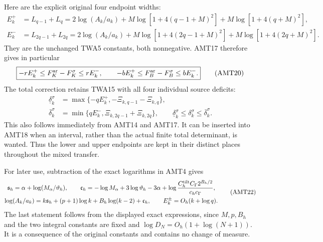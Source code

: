 \documentclass[11pt,a4paper]{article}
\begin{document}
Here are the explicit original four endpoint widths:
\[
\begin{aligned}
 E_k^+&=L_{q-1}+L_q
   =2\log(A_k/a_k)+M\log[1+4(q-1+M)^2]
                         +M\log[1+4(q+M)^2],\\
 E_k^-&=L_{2q-1}+L_{2q}
   =2\log(A_k/a_k)+M\log[1+4(2q-1+M)^2]
                         +M\log[1+4(2q+M)^2].
\end{aligned}\tag{AMT19}
\]
They are the unchanged TWA5 constants, both nonnegative. AMT17
therefore gives in particular
\[
 \boxed{-rE_k^+\le F_K^{\rm ar}-F_K^\sigma\le rE_k^-,\qquad
        -bE_k^+\le F_B^{\rm ar}-F_B^\sigma\le bE_k^-.}
 \tag{AMT20}
\]
The total correction retains TWA15 with all four individual source
deficits:
\[
\begin{aligned}
 \underline\delta_k^\sigma
   &=\max\{-qE_k^+,-\Xi_{k,q-1}-\Xi_{k,q}\},\\
 \overline\delta_k^\sigma
   &=\min\{qE_k^-,\Xi_{k,2q-1}+\Xi_{k,2q}\},\qquad
 \underline\delta_k^\sigma\le\delta_k^\sigma\le\overline\delta_k^\sigma.
\end{aligned}\tag{AMT21}
\]
This also follows immediately from AMT14 and AMT17. It can be
inserted into AMT18 when an interval, rather than the actual finite
total determinant, is wanted. Thus the lower and upper endpoints
are kept in their distinct places throughout the mixed transfer.

For later use, subtraction of the exact logarithms in AMT4 gives
\[
\begin{gathered}
 \mathfrak s_h=\alpha+\log(M_\alpha/\vartheta_h),\qquad
 \mathfrak c_h=-\log M_\alpha+3\log\vartheta_h-3\alpha
       +\log\frac{C_h^{\rm tilt}C_\Gamma2^{B_h/2}}{c_hc_\Gamma},\\
 \log(A_k/a_k)=k\mathfrak s_h+(p+1)\log k
                         +B_h\log(k-2)+\mathfrak c_h,\qquad
 E_k^\pm=O_h(k+\log q).
\end{gathered}\tag{AMT22}
\]
The last statement follows from the displayed exact expressions,
since $M,p,B_h$ and the two integral constants are fixed and
$\log D_N=O_h(1+\log(N+1))$. It is a consequence of the original
constants and contains no change of measure.
\end{document}
